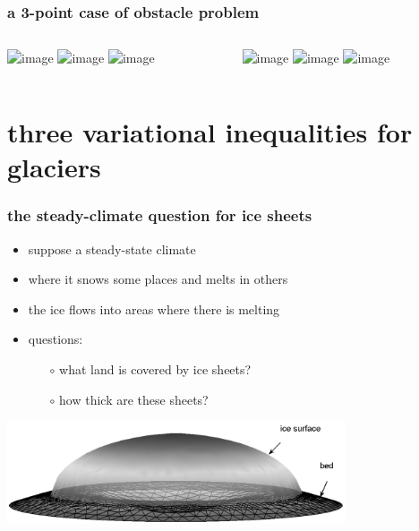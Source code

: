 \documentclass{beamer}
\begin{document}
\begin{frame}
  \frametitle{a 3-point case of obstacle problem}

\begin{columns}
\begin{column}{0.5\textwidth}
\begin{center}
\includegraphics<1>[height=0.5\textheight]{case_f0_psi1_oneD.png}
\includegraphics<2>[height=0.5\textheight]{case_f2_psi0_oneD.png}
\includegraphics<3>[height=0.5\textheight]{case_f-1_psi-1_oneD.png}
\end{center}
\end{column}
\begin{column}{0.5\textwidth}
\begin{center}
\includegraphics<1>[height=0.5\textheight]{case_f0_psi1_convex.png}
\includegraphics<2>[height=0.5\textheight]{case_f2_psi0_convex.png}
\includegraphics<3>[height=0.5\textheight]{case_f-1_psi-1_convex.png}
\end{center}
\end{column}
\end{columns}

\begin{center}
\end{center}
\end{frame}




\section[glaciers]{three variational inequalities for glaciers}


\begin{frame}
  \frametitle{the steady-climate question for ice sheets}

\begin{itemize}
\item suppose a steady-state climate
\item where it snows some places and melts in others
\item the ice flows into areas where there is melting
\item questions:
  \begin{itemize}
  \item[$\circ$]  what land is covered by ice sheets?
  \item[$\circ$]  how thick are these sheets?
  \end{itemize}
\end{itemize}
\begin{center}
\includegraphics[width=0.75\textwidth]{capnonflatobs}
\end{center}
\end{frame}
\end{document}
